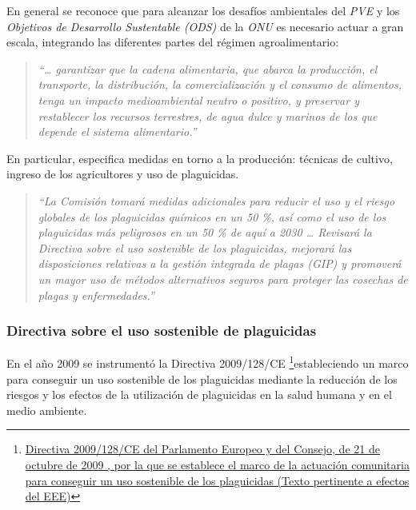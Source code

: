 \documentclass[a4paper, nobind]{templates/ociamthesis}
\begin{document}
En general se reconoce que para alcanzar los desafíos ambientales del
\emph{PVE} y los \emph{Objetivos de Desarrollo Sustentable (ODS)} de la \emph{ONU} es
necesario actuar a gran escala, integrando las diferentes partes del
régimen agroalimentario:

\begin{quote}
\emph{``\ldots{} garantizar que la cadena alimentaria, que abarca la producción,
el transporte, la distribución, la comercialización y el consumo de
alimentos, tenga un impacto medioambiental neutro o positivo, y
preservar y restablecer los recursos terrestres, de agua dulce y
marinos de los que depende el sistema alimentario.''}
\end{quote}

En particular, especifica medidas en torno a la producción: técnicas de
cultivo, ingreso de los agricultores y uso de plaguicidas.

\begin{quote}
\emph{``La Comisión tomará medidas adicionales para reducir el uso y el
riesgo globales de los plaguicidas químicos en un 50 \%, así como el
uso de los plaguicidas más peligrosos en un 50 \% de aquí a 2030 \ldots{}
Revisará la Directiva sobre el uso sostenible de los plaguicidas,
mejorará las disposiciones relativas a la gestión integrada de plagas
(GIP) y promoverá un mayor uso de métodos alternativos seguros para
proteger las cosechas de plagas y enfermedades.''}
\end{quote}

\hypertarget{directiva-sobre-el-uso-sostenible-de-plaguicidas}{%
\subsubsection{Directiva sobre el uso sostenible de plaguicidas}\label{directiva-sobre-el-uso-sostenible-de-plaguicidas}}

En el año 2009 se instrumentó la Directiva 2009/128/CE
\footnote{\href{https://eur-lex.europa.eu/legal-content/ES/TXT/?uri=celex\%3A32009L0128}{Directiva 2009/128/CE del Parlamento Europeo y
  del Consejo, de 21 de octubre de 2009 , por la que se establece el
  marco de la actuación comunitaria para conseguir un uso sostenible
  de los plaguicidas (Texto pertinente a efectos del
  EEE)}}estableciendo un marco para conseguir un uso
sostenible de los plaguicidas mediante la reducción de los riesgos y los
efectos de la utilización de plaguicidas en la salud humana y en el
medio ambiente.
\end{document}

